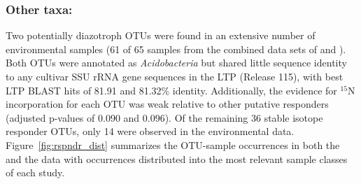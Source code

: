 \subsubsection{\textbf{Other taxa:}} Two potentially diazotroph OTUs were found
in an extensive number of environmental samples (61 of 65 samples from the
combined data sets of \citet{Garcia_Pichel_2013} and \citet{Steven_2013}).
Both OTUs were annotated as \textit{Acidobacteria} but shared little sequence
identity to any cultivar SSU rRNA gene sequences in the LTP (Release 115),
with best LTP BLAST hits of 81.91 and 81.32\% identity. Additionally, the
evidence for $^{15}$N incorporation for each OTU was weak relative to other
putative responders (adjusted p-values of 0.090 and 0.096). Of the remaining
36 stable isotope responder OTUs, only 14 were observed in the environmental
data.  Figure~\ref{fig:rspndr_dist} summarizes the OTU-sample occurrences in
both the \citet{Steven_2013} and the \citet{Garcia_Pichel_2013} data with
occurrences distributed into the most relevant sample classes of each study.

